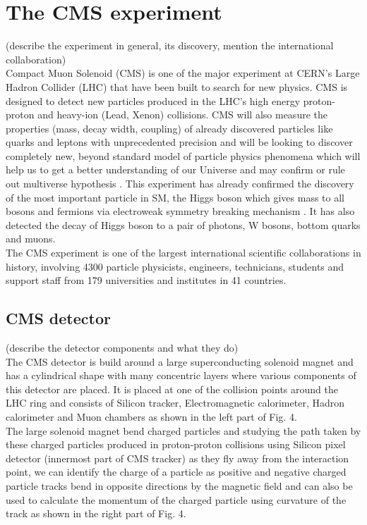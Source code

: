 \section{The CMS experiment}
\label{sec:cms}
(describe the experiment in general, its discovery, mention the international collaboration) \\

\onehalfspacing Compact Muon Solenoid (CMS) is one of the major experiment at CERN's Large Hadron Collider (LHC) that have been built to search for new physics. CMS is designed to detect new particles produced in the LHC's high energy proton-proton and heavy-ion (Lead, Xenon) collisions. CMS will also measure the properties (mass, decay width, coupling) of already discovered particles like quarks and leptons with unprecedented precision and will be looking to discover completely new, beyond standard model of particle physics phenomena which will help us to get a better understanding of our Universe and may confirm or rule out multiverse hypothesis \cite{Chatrchyan:1129810}. This experiment has already confirmed the discovery of the most important particle in SM, the Higgs boson which gives mass to all bosons and fermions via electroweak symmetry breaking mechanism \cite{Chatrchyan:2012xdj}. It has also detected the decay of Higgs boson to a pair of photons, W bosons, bottom quarks and muons.  \\

The CMS experiment is one of the largest international scientific collaborations in history, involving 4300 particle physicists, engineers, technicians, students and support staff from 179 universities and institutes in 41 countries. \\

\subsection{CMS detector}
(describe the detector components and what they do) \\

The CMS detector is build around a large superconducting solenoid magnet and has a cylindrical shape with many concentric layers where various components of this detector are placed. It is placed at one of the collision points around the LHC ring and consists of Silicon tracker, Electromagnetic calorimeter, Hadron calorimeter and Muon chambers as shown in the left part of Fig. 4. \\

The large solenoid magnet bend charged particles and studying the path taken by these charged particles produced in proton-proton collisions using Silicon pixel detector (innermost part of CMS tracker) as they fly away from the interaction point, we can identify the charge of a particle as positive and negative charged particle tracks bend in opposite directions by the magnetic field and can also be used to calculate the momentum of the charged particle using curvature of the track as shown in the right part of Fig. 4. \\

